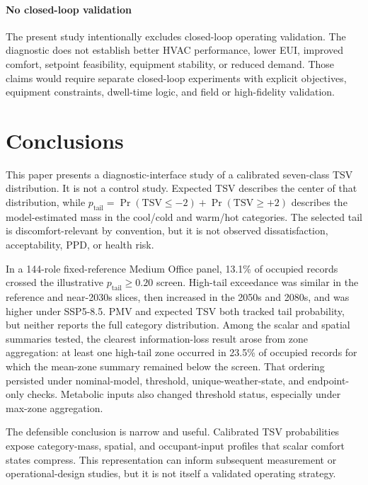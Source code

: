 \paragraph{No closed-loop validation}
The present study intentionally excludes closed-loop operating validation. The diagnostic does not establish better HVAC performance, lower EUI, improved comfort, setpoint feasibility, equipment stability, or reduced demand. Those claims would require separate closed-loop experiments with explicit objectives, equipment constraints, dwell-time logic, and field or high-fidelity validation.

\section{Conclusions}

This paper presents a diagnostic-interface study of a calibrated seven-class TSV distribution. It is not a control study. Expected TSV describes the center of that distribution, while $p_{\mathrm{tail}}=\Pr(\mathrm{TSV}\le-2)+\Pr(\mathrm{TSV}\ge+2)$ describes the model-estimated mass in the cool/cold and warm/hot categories. The selected tail is discomfort-relevant by convention, but it is not observed dissatisfaction, acceptability, PPD, or health risk.

In a 144-role fixed-reference Medium Office panel, 13.1\% of occupied records crossed the illustrative $p_{\mathrm{tail}}\ge0.20$ screen. High-tail exceedance was similar in the reference and near-2030s slices, then increased in the 2050s and 2080s, and was higher under SSP5-8.5. PMV and expected TSV both tracked tail probability, but neither reports the full category distribution. Among the scalar and spatial summaries tested, the clearest information-loss result arose from zone aggregation: at least one high-tail zone occurred in 23.5\% of occupied records for which the mean-zone summary remained below the screen. That ordering persisted under nominal-model, threshold, unique-weather-state, and endpoint-only checks. Metabolic inputs also changed threshold status, especially under max-zone aggregation.

The defensible conclusion is narrow and useful. Calibrated TSV probabilities expose category-mass, spatial, and occupant-input profiles that scalar comfort states compress. This representation can inform subsequent measurement or operational-design studies, but it is not itself a validated operating strategy.
